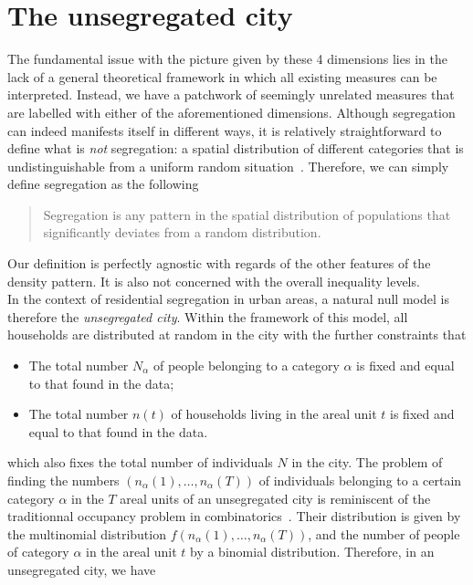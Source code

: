 \section{The unsegregated city}
\label{sec:null_model_the_unsegregated_city}

The fundamental issue with the picture given by these 4 dimensions lies in the
lack of a general theoretical framework in which all existing measures can be
interpreted.  Instead, we have a patchwork of seemingly unrelated measures that
are labelled with either of the aforementioned dimensions. Although segregation
can indeed manifests itself in different ways, it is relatively straightforward
to define what is \emph{not} segregation: a spatial distribution of different
categories that is undistinguishable from a uniform random
situation~\cite{Jahn:1947}. Therefore, we can simply define segregation as the
following

\begin{quote}
Segregation is any pattern in the spatial distribution of populations that significantly 
deviates from a random distribution. 
\end{quote} 

Our definition is perfectly agnostic with regards of the other features of the
density pattern. It is also not concerned with the overall inequality levels.\\


In the context of residential segregation in urban areas, a natural null model
is therefore the \emph{unsegregated city}. Within the framework of this model,
all households are distributed at random in the city with the further
constraints that

\begin{itemize}
    \item The total number $N_\alpha$ of people belonging to a category
	    $\alpha$ is fixed and equal to that found in the data;
    \item The total number $n(t)$ of households living in the areal unit $t$ is
	    fixed and equal to that found in the data.
\end{itemize}

which also fixes the total number of individuals $N$ in the city. The problem of
finding the numbers $\left( n_\alpha(1), \dots, n_\alpha(T) \right)$ of
individuals belonging to a certain category $\alpha$ in the $T$ areal units of
an unsegregated city is reminiscent of the traditionnal occupancy problem in
combinatorics~\cite{Feller:1950}. Their distribution is given by the multinomial
distribution $f \left( n_\alpha(1), \dots, n_\alpha(T) \right)$, and the number
of people of category $\alpha$ in the areal unit $t$ by a binomial distribution.
Therefore, in an unsegregated city, we have

